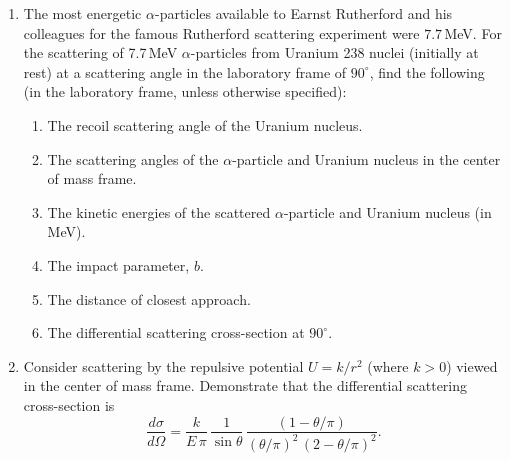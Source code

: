 {\begin{enumerate}
angular distribution of the scattering in the center of mass frame?
\item The most energetic $\alpha$-particles available to Earnst Rutherford and his colleagues for the
famous Rutherford scattering experiment were $7.7$\,MeV. For the scattering of 7.7\,MeV $\alpha$-particles from Uranium 238 nuclei (initially at rest) at a scattering angle in the laboratory frame of
$90^\circ$, find the following (in the laboratory frame, unless otherwise specified):
\begin{enumerate}
\item The recoil scattering angle of the Uranium nucleus. 
\item The scattering angles of the $\alpha$-particle and Uranium nucleus in the center of mass
frame.
\item The kinetic energies of the scattered $\alpha$-particle and Uranium nucleus (in MeV).
\item The impact parameter, $b$.
\item The distance of closest approach.
\item The differential scattering cross-section at $90^\circ$. 
\end{enumerate}
\item Consider scattering by the repulsive potential $U=k/r^2$ (where $k>0$)
viewed in the center of mass frame. Demonstrate that the differential
scattering cross-section is
$$
\frac{d\sigma}{d\Omega } = \frac{k}{E\,\pi}\, \frac{1}{\sin\theta}\,
\frac{(1-\theta/\pi)}{(\theta/\pi)^2\,(2-\theta/\pi)^2}.
$$
\end{enumerate}
}
